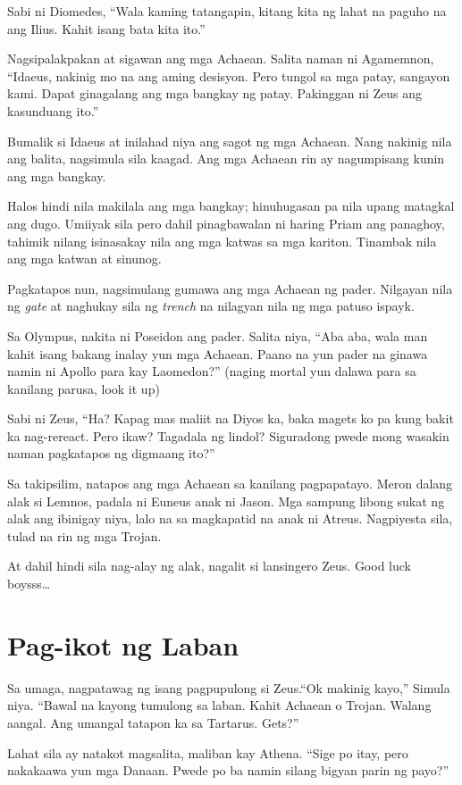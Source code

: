 \documentclass[12pt,letterpaper]{report}
\begin{document}
Sabi ni Diomedes, ``Wala kaming tatangapin, kitang kita ng lahat na paguho na ang Ilius. Kahit isang bata kita ito.''

Nagsipalakpakan at sigawan ang mga Achaean. Salita naman ni Agamemnon, ``Idaeus, nakinig mo na ang aming desisyon. Pero tungol sa mga patay, sangayon kami. Dapat ginagalang ang mga bangkay ng patay. Pakinggan ni Zeus ang kasunduang ito.''

Bumalik si Idaeus at inilahad niya ang sagot ng mga Achaean. Nang nakinig nila ang balita, nagsimula sila kaagad. Ang mga Achaean rin ay nagumpisang kunin ang mga bangkay.

Halos hindi nila makilala ang mga bangkay; hinuhugasan pa nila upang matagkal ang dugo. Umiiyak sila pero dahil pinagbawalan ni haring Priam ang panaghoy, tahimik nilang isinasakay nila ang mga katwas sa mga kariton. Tinambak nila ang mga katwan at sinunog.

Pagkatapos nun, nagsimulang gumawa ang mga Achaean ng pader. Nilgayan nila ng \textit{gate} at naghukay sila ng \textit{trench} na nilagyan nila ng mga patuso ispayk.

Sa Olympus, nakita ni Poseidon ang pader. Salita niya, ``Aba aba, wala man kahit isang bakang inalay yun mga Achaean. Paano na yun pader na ginawa namin ni Apollo para kay Laomedon?'' (naging mortal yun dalawa para sa kanilang parusa, look it up)

Sabi ni Zeus, ``Ha? Kapag mas maliit na Diyos ka, baka magets ko pa kung bakit ka nag-rereact. Pero ikaw? Tagadala ng lindol? Siguradong pwede mong wasakin naman pagkatapos ng digmaang ito?''

Sa takipsilim, natapos ang mga Achaean sa kanilang pagpapatayo. Meron dalang alak si Lemnos, padala ni Euneus anak ni Jason. Mga sampung libong sukat ng alak ang ibinigay niya, lalo na sa magkapatid na anak ni Atreus. Nagpiyesta sila, tulad na rin ng mga Trojan.

At dahil hindi sila nag-alay ng alak, nagalit si lansingero Zeus. Good luck boysss\dots
\pagebreak
\chapter{Pag-ikot ng Laban}
Sa umaga, nagpatawag ng isang pagpupulong si Zeus.``Ok makinig kayo,'' Simula niya. ``Bawal na kayong tumulong sa laban. Kahit Achaean o Trojan. Walang aangal. Ang umangal tatapon ka sa Tartarus. Gets?''

Lahat sila ay natakot magsalita, maliban kay Athena. ``Sige po itay, pero nakakaawa yun mga Danaan. Pwede po ba namin silang bigyan parin ng payo?''
\end{document}
